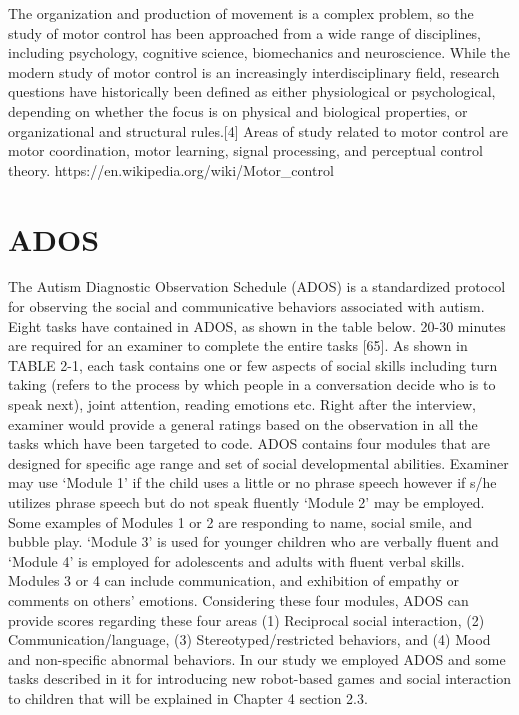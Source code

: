 The organization and production of movement is a complex problem, so the study of motor control has been approached from a wide range of disciplines, including psychology, cognitive science, biomechanics and neuroscience. While the modern study of motor control is an increasingly interdisciplinary field, research questions have historically been defined as either physiological or psychological, depending on whether the focus is on physical and biological properties, or organizational and structural rules.[4] Areas of study related to motor control are motor coordination, motor learning, signal processing, and perceptual control theory.
https://en.wikipedia.org/wiki/Motor_control


\section{ADOS}
The Autism Diagnostic Observation Schedule (ADOS) is a standardized protocol
for observing the social and communicative behaviors associated with autism. Eight tasks
have contained in ADOS, as shown in the table below. 20-30 minutes are required for an
examiner to complete the entire tasks [65].
As shown in TABLE 2-1, each task contains one or few aspects of social skills
including turn taking (refers to the process by which people in a conversation decide who
is to speak next), joint attention, reading emotions etc. Right after the interview, examiner
would provide a general ratings based on the observation in all the tasks which have been
targeted to code.
ADOS contains four modules that are designed for specific age range and set of social
developmental abilities. Examiner may use ‘Module 1’ if the child uses a little or no phrase
speech however if s/he utilizes phrase speech but do not speak fluently ‘Module 2’ may be
employed. Some examples of Modules 1 or 2 are responding to name, social smile, and
bubble play. ‘Module 3’ is used for younger children who are verbally fluent and ‘Module
4’ is employed for adolescents and adults with fluent verbal skills. Modules 3 or 4 can
include communication, and exhibition of empathy or comments on others' emotions.
Considering these four modules, ADOS can provide scores regarding these four areas (1)
Reciprocal social interaction, (2) Communication/language, (3) Stereotyped/restricted
behaviors, and (4) Mood and non-specific abnormal behaviors. In our study we employed
ADOS and some tasks described in it for introducing new robot-based games and social
interaction to children that will be explained in Chapter 4 section 2.3.



